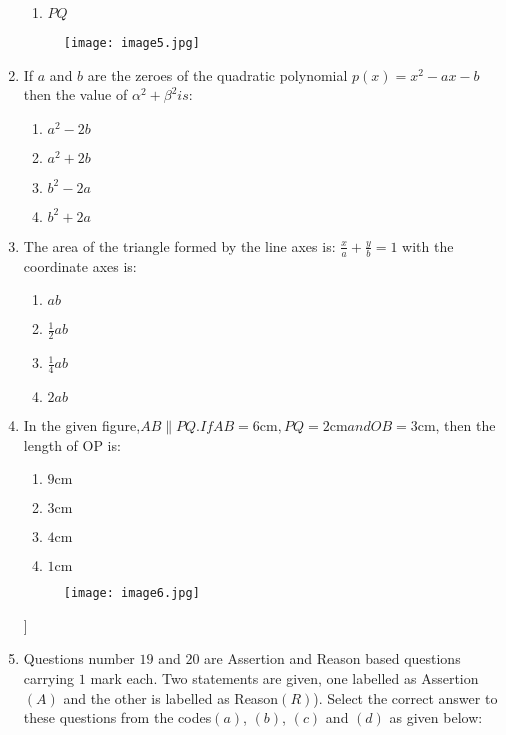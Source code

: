 \documentclass[12pt-letter paper]{article}
\providecommand{\brak}[1]{\ensuremath{\left(#1\right)}}
\begin{document}
\begin{enumerate}
\begin{enumerate}
\item $ PQ $
\end{enumerate}  
\begin{figure}[!ht]                                    
\centering                                            
\texttt{[image: image5.jpg]}      
\label{fig:image5}                                      
\end{figure}                                            
\item If $a$ and $b$ are the zeroes of the quadratic polynomial $ p\brak x = x^2 - ax - b $ then the value of $ \alpha^
2 + \beta ^2 is $:
\begin{enumerate}
\item $ a^2-2b $                                  
\item $ a^2+2b $                                  
\item $ b^2-2a $                              
\item $ b^2+2a $  
\end{enumerate}
\item The area of the triangle formed by the line axes is: $\frac{x}{a} +\frac{y}{b} = 1$ with the coordinate axes is:  
\begin{enumerate}
\item $ ab $                                    
\item $ \frac{1}{2}ab $        
\item $ \frac{1}{4}ab $              
\item $ 2ab $
\end{enumerate}
\item In the given figure,$ AB \parallel PQ. If AB = 6\mathrm{cm}, PQ =   2\mathrm{cm} and OB = 3\mathrm{cm}$, then the length of OP is:
\begin{enumerate}
\item $ 9\mathrm{cm} $                                      
\item $ 3\mathrm{cm} $        
\item $ 4\mathrm{cm} $                                    
\item $ 1\mathrm{cm} $  
\end{enumerate}
\begin{figure}[h!]      
\centering
\texttt{[image: image6.jpg]}
\label{fig:image6}                                
\end{figure}]
\item Questions number $19$ and $20$ are Assertion and Reason based questions carrying $1$ mark each. Two statements are given, one labelled as Assertion \brak{A} and the other is labelled as Reason\brak{R}). Select the correct answer to these questions from the codes\brak{a}, \brak{b}, \brak{c} and \brak{d} as given below:

\end{enumerate}
\end{document}
